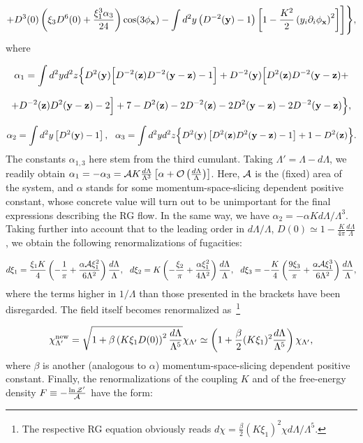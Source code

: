 \documentclass[a4paper,12pt]{article}
\begin{document}
$$+D^3(0)\left(\xi_3D^6(0)+\frac{\xi_1^3\alpha_3}{24}\right)\cos(3\phi_{\bf x})-
\int d^2y\left(D^{-2}({\bf y})-1\right)\left[1-\frac{K^2}{2}\left(y_i\partial_i\phi_{\bf x}\right)^2\right]\Biggr]\Biggr\},$$
where

$$\alpha_1=\int d^2yd^2z\Bigl\{D^2({\bf y})\Bigl[D^{-2}({\bf z})D^{-2}({\bf y}-{\bf z})-1\Bigr]+
D^{-2}({\bf y})\Bigl[D^2({\bf z})D^{-2}({\bf y}-{\bf z})+$$

$$+D^{-2}({\bf z})D^2({\bf y}-{\bf z})-2\Bigr]+7-
D^2({\bf z})-2D^{-2}({\bf z})-2D^2({\bf y}-{\bf z})-2D^{-2}({\bf y}-{\bf z})\Bigr\},$$

$$
\alpha_2=\int d^2y\left[D^2({\bf y})-1\right],~~
\alpha_3=\int d^2yd^2z\Bigl\{D^2({\bf y})\left[D^2({\bf z})D^2({\bf y}-{\bf z})-1\right]+1-D^2({\bf z})\Bigr\}.$$
The constants $\alpha_{1,3}$ here stem from the third cumulant. Taking $\Lambda'=\Lambda-d\Lambda$, we readily obtain
$\alpha_1=-\alpha_3={\cal A}K\frac{d\Lambda}{\Lambda^3}\left[\alpha+{\cal O}\left(\frac{d\Lambda}{\Lambda}\right)\right]$. Here,
${\cal A}$ is the (fixed) area of the system, and $\alpha$
stands for some momentum-space-slicing dependent positive constant,
whose concrete value will turn out to be unimportant for the final expressions describing the
RG flow. In the same way, we have $\alpha_2=-\alpha Kd\Lambda/\Lambda^3$. Taking further into account that
to the leading order in $d\Lambda/\Lambda$, $D(0)\simeq 1-\frac{K}{4\pi}\frac{d\Lambda}{\Lambda}$, we obtain the
following renormalizations of fugacities:

$$
d\xi_1=\frac{\xi_1K}{4}\left(-\frac{1}{\pi}+\frac{\alpha{\cal A}\xi_1^2}{6\Lambda^2}\right)\frac{d\Lambda}{\Lambda},~~
d\xi_2=K\left(-\frac{\xi_2}{\pi}+\frac{\alpha \xi_1^2}{4\Lambda^2}\right)\frac{d\Lambda}{\Lambda},~~
d\xi_3=-\frac{K}{4}\left(\frac{9\xi_3}{\pi}+\frac{\alpha{\cal A}\xi_1^3}{6\Lambda^2}\right)\frac{d\Lambda}{\Lambda},$$
where the terms higher in $1/\Lambda$ than those presented in the brackets have been disregarded.
The field itself becomes renormalized as~\footnote{The respective RG equation obviously reads $d\chi=\frac{\beta}{2}
(K\xi_1)^2\chi d\Lambda/\Lambda^5$.}

$$\chi_{\Lambda'}^{\rm new}=\sqrt{1+\beta\left(K\xi_1D(0)\right)^2\frac{d\Lambda}{\Lambda^5}}\chi_{\Lambda'}\simeq
\left(1+\frac{\beta}{2}(K\xi_1)^2\frac{d\Lambda}{\Lambda^5}\right)\chi_{\Lambda'},$$
where $\beta$ is another (analogous to $\alpha$)
momentum-space-slicing dependent positive constant. Finally, the renormalizations of the coupling $K$ and of the free-energy density
$F\equiv-\frac{\ln{\cal Z}'}{{\cal A}}$ have the form:
\end{document}
